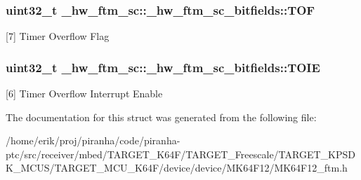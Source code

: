 \subsubsection[{\texorpdfstring{T\+OF}{TOF}}]{\setlength{\rightskip}{0pt plus 5cm}uint32\+\_\+t \+\_\+hw\+\_\+ftm\+\_\+sc\+::\+\_\+hw\+\_\+ftm\+\_\+sc\+\_\+bitfields\+::\+T\+OF}\hypertarget{struct__hw__ftm__sc_1_1__hw__ftm__sc__bitfields_a335ef4419cc68559c63157f4a0af5747}{}\label{struct__hw__ftm__sc_1_1__hw__ftm__sc__bitfields_a335ef4419cc68559c63157f4a0af5747}
\mbox{[}7\mbox{]} Timer Overflow Flag 
\subsubsection[{\texorpdfstring{T\+O\+IE}{TOIE}}]{\setlength{\rightskip}{0pt plus 5cm}uint32\+\_\+t \+\_\+hw\+\_\+ftm\+\_\+sc\+::\+\_\+hw\+\_\+ftm\+\_\+sc\+\_\+bitfields\+::\+T\+O\+IE}\hypertarget{struct__hw__ftm__sc_1_1__hw__ftm__sc__bitfields_af5c5dd72a2248ab4fa4b448321f616fe}{}\label{struct__hw__ftm__sc_1_1__hw__ftm__sc__bitfields_af5c5dd72a2248ab4fa4b448321f616fe}
\mbox{[}6\mbox{]} Timer Overflow Interrupt Enable 

The documentation for this struct was generated from the following file\+:\begin{DoxyCompactItemize}
\item 
/home/erik/proj/piranha/code/piranha-\/ptc/src/receiver/mbed/\+T\+A\+R\+G\+E\+T\+\_\+\+K64\+F/\+T\+A\+R\+G\+E\+T\+\_\+\+Freescale/\+T\+A\+R\+G\+E\+T\+\_\+\+K\+P\+S\+D\+K\+\_\+\+M\+C\+U\+S/\+T\+A\+R\+G\+E\+T\+\_\+\+M\+C\+U\+\_\+\+K64\+F/device/device/\+M\+K64\+F12/M\+K64\+F12\+\_\+ftm.\+h\end{DoxyCompactItemize}
